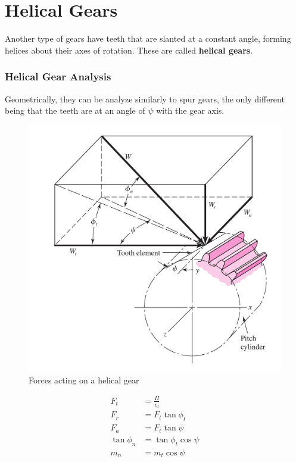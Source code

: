 \documentclass[a4paper,openany]{tufte-book}
\begin{document}
\chapter{Helical Gears}
\label{sec:orgc4a405d}

Another type of gears have teeth that are slanted at a constant angle, forming helices about their axes of rotation. These are called \textbf{helical gears}.


\subsection{Helical Gear Analysis}
\label{sec:org7d7042a}

Geometrically, they can be analyze similarly to spur gears, the only different being that the teeth are at an angle of \(\psi\) with the gear axis.

\begin{figure}[htbp]
\centering
\includegraphics[width=.9\linewidth]{./pictures/Gears/helical-gear-forces.png}
\caption{\label{fig: helical gear forces}Forces acting on a helical gear}
\end{figure}

\begin{align}
  F_{t} &= \frac{H}{v_{t}} \\
  F_{r} &= F_{t} \tan \phi_{t} \\
  F_{a} &= F_{t} \tan \psi \\
  \tan \phi_{n} &= \tan \phi_{t} \cos \psi \\
  m_{n} &= m_{t} \cos \psi
\end{align}
\end{document}
